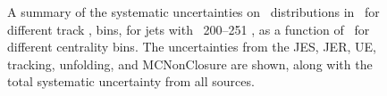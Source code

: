 \begin{figure}
{\begin{tabular}{cc}
\end{tabular} }
   \caption{A summary of the systematic uncertainties on \Dptr\ distributions in \pbpb\ for different track \pt, bins, for jets with \pt\ 200--251  \GeV, as a function of \rvar\ for different centrality bins. The uncertainties from the JES, JER, UE, tracking, unfolding, and MCNonClosure are shown, along with the total systematic uncertainty from all sources. }
      \label{fig:dptr_sys_uncert_A2}
\end{figure}

 \begin{figure}
\end{figure}
